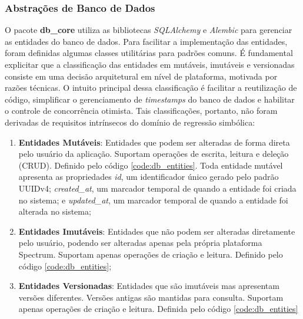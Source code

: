 \subsubsection{Abstrações de Banco de Dados}
O pacote \textbf{db\_core} utiliza as bibliotecas \textit{SQLAlchemy} e \textit{Alembic} para gerenciar as entidades do banco de dados. Para facilitar a implementação das entidades, foram definidas algumas classes utilitárias para padrões comuns. É fundamental explicitar que a classificação das entidades em mutáveis, imutáveis e versionadas consiste em uma decisão arquitetural em nível de plataforma, motivada por razões técnicas. O intuito principal dessa classificação é facilitar a reutilização de código, simplificar o gerenciamento de \textit{timestamps} do banco de dados e habilitar o controle de concorrência otimista. Tais classificações, portanto, não foram derivadas de requisitos intrínsecos do domínio de regressão simbólica:
\begin{enumerate}
    \item \textbf{Entidades Mutáveis}: Entidades que podem ser alteradas de forma direta pelo usuário da aplicação. Suportam operações de escrita, leitura e deleção (CRUD). Definido pelo código \ref{code:db_entities}. Toda entidade mutável apresenta as propriedades \textit{id}, um identificador único gerado pelo padrão UUIDv4; \textit{created\_at}, um marcador temporal de quando a entidade foi criada no sistema; e \textit{updated\_at}, um marcador temporal de quando a entidade foi alterada no sistema;
    \item \textbf{Entidades Imutáveis}: Entidades que não podem ser alteradas diretamente pelo usuário, podendo ser alteradas apenas pela própria plataforma Spectrum. Suportam apenas operações de criação e leitura. Definido pelo código \ref{code:db_entities};
    \item \textbf{Entidades Versionadas}: Entidades que são imutáveis mas apresentam versões diferentes. Versões antigas são mantidas para consulta. Suportam apenas operações de criação e leitura. Definida pelo código \ref{code:db_entities}
\end{enumerate}

